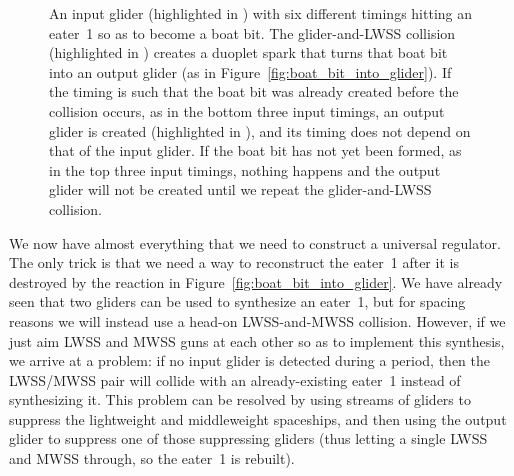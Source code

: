 \begin{figure}[!htb]
	\centering
	\caption{An input glider (highlighted in ) with six different timings hitting an eater~1 so as to become a boat bit. The glider-and-LWSS collision (highlighted in ) creates a duoplet spark that turns that boat bit into an output glider (as in Figure~\ref{fig:boat_bit_into_glider}). If the timing is such that the boat bit was already created before the collision occurs, as in the bottom three input timings, an output glider is created (highlighted in ), and its timing does not depend on that of the input glider. If the boat bit has not yet been formed, as in the top three input timings, nothing happens and the output glider will not be created until we repeat the glider-and-LWSS collision.}\label{fig:make_sync_glider}
\end{figure}

We now have almost everything that we need to construct a universal regulator. The only trick is that we need a way to reconstruct the eater~1 after it is destroyed by the reaction in Figure~\ref{fig:boat_bit_into_glider}. We have already seen that two gliders can be used to synthesize an eater~1, but for spacing reasons we will instead use a head-on LWSS-and-MWSS collision. However, if we just aim LWSS and MWSS guns at each other so as to implement this synthesis, we arrive at a problem: if no input glider is detected during a period, then the LWSS/MWSS pair will collide with an already-existing eater~1 instead of synthesizing it. This problem can be resolved by using streams of gliders to suppress the lightweight and middleweight spaceships, and then using the output glider to suppress one of those suppressing gliders (thus letting a single LWSS and MWSS through, so the eater~1 is rebuilt).

